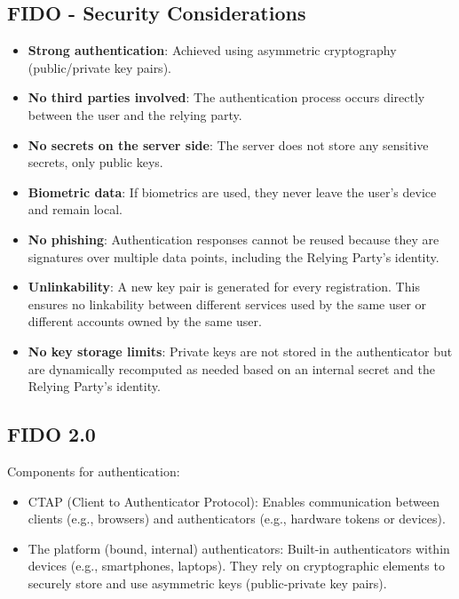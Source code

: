 \subsection*{FIDO - Security Considerations}
\begin{itemize}
    \item \textbf{Strong authentication}: Achieved using asymmetric cryptography (public/private key pairs).
    \item \textbf{No third parties involved}: The authentication process occurs directly between the user and the relying party.
    \item \textbf{No secrets on the server side}: The server does not store any sensitive secrets, only public keys.
    \item \textbf{Biometric data}: If biometrics are used, they never leave the user’s device and remain local.
    \item \textbf{No phishing}: Authentication responses cannot be reused because they are signatures over multiple data points, including the Relying Party's identity.
    \item \textbf{Unlinkability}: A new key pair is generated for every registration. This ensures no linkability between different services used by the same user or different accounts owned by the same user.
    \item \textbf{No key storage limits}: Private keys are not stored in the authenticator but are dynamically recomputed as needed based on an internal secret and the Relying Party's identity.
\end{itemize}

\subsection*{FIDO 2.0}
Components for authentication:
\begin{itemize}
    \item CTAP (Client to Authenticator Protocol): Enables communication between clients (e.g., browsers) and authenticators (e.g., hardware tokens or devices).
    \item The platform (bound, internal) authenticators: Built-in authenticators within devices (e.g., smartphones, laptops). They rely on cryptographic elements to securely store and use asymmetric keys (public-private key pairs).
\end{itemize}


